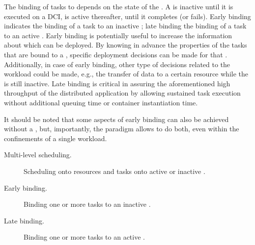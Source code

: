 \documentclass{sig-alternate}
\begin{document}
The binding of tasks to \pilots depends on the state of the \pilot. A \pilot is
inactive until it is executed on a DCI, is active thereafter, until it completes
(or fails).  Early binding indicates the binding of a task to an inactive
\pilot; late binding the binding of a task to an active \pilot. Early binding is
potentially useful to increase the information about which \pilots can be
deployed. By knowing in advance the properties of the tasks that are bound to a
\pilot, specific deployment decisions can be made for that \pilot. Additionally,
in case of early binding, other type of decisions related to the workload could
be made, e.g., the transfer of data to a certain resource while the \pilot is
still inactive. Late binding is critical in assuring the aforementioned high
throughput of the distributed application by allowing sustained task execution
without additional queuing time or container instantiation time.

It should be noted that some aspects of early binding can also
be achieved without a \pilot, but, importantly, the \pilot paradigm allows to
do both, even within the confinements of a single workload.  

\begin{description}

\item[Multi-level scheduling.] Scheduling \pilots onto resources and tasks onto
active or inactive \pilots.

\item[Early binding.] Binding one or more tasks to an inactive \pilot.

\item[Late binding.] Binding one or more tasks to an active \pilot.

\end{description}

\end{document}
